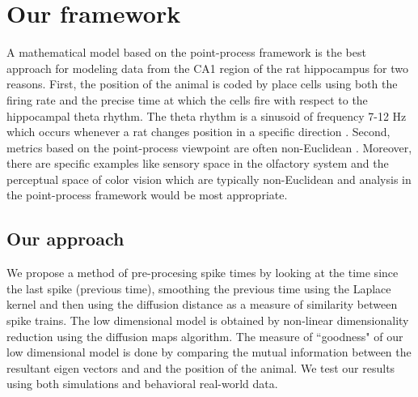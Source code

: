 \section{Our framework}


A mathematical model based on the point-process framework is the best approach for 
modeling  data from the CA1 region of the rat hippocampus for two reasons.
First, the position of the animal is coded by place cells using both the firing rate
and the precise time at which the cells fire with respect to the hippocampal theta rhythm.
The theta rhythm is a sinusoid of frequency 7-12 Hz which occurs whenever a rat changes
position in  a specific direction \cite{OKeefe1971, Burgess1993}.
Second,  metrics based on the point-process viewpoint are often non-Euclidean \cite{Aronov2004, Victor2005}. Moreover, there are specific examples like sensory space in  the olfactory system and the perceptual space of color vision which are typically non-Euclidean and analysis in the point-process framework would be most appropriate.\\


\subsection{Our approach}

We propose a method of pre-procesing spike times by looking at the time since the 
last spike (previous time), smoothing the previous time using the Laplace kernel
and then using the diffusion distance \cite{coifman2006diffusion} as a measure of similarity
between spike trains. The low dimensional model is obtained by non-linear dimensionality reduction using the diffusion maps algorithm. The measure of ``goodness" of our low dimensional model is done by comparing the mutual information  \cite{quiroga2009extracting, Dayan2001}  between the resultant eigen vectors and and the position of the animal. We test our results using both simulations and behavioral real-world data.\\


























